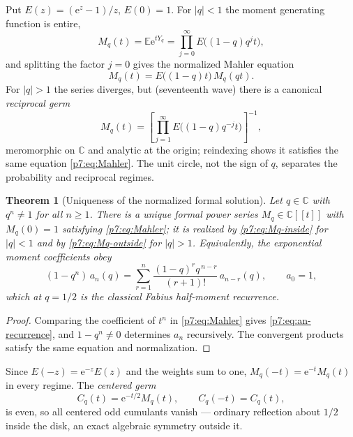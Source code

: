 \documentclass[11pt,oneside]{article}
\numberwithin{equation}{section}
\newtheorem{theorem}{Theorem}[section]
\theoremstyle{definition}
\theoremstyle{remark}
\newcommand{\C}{\mathbb C}
\newcommand{\E}{\mathbb E}
\newcommand{\e}{\mathrm e}
\begin{document}
Put $E(z)=(\e^z-1)/z$, $E(0)=1$.  For $|q|<1$ the moment generating function
is entire,
\begin{equation}\label{p7:eq:Mq-inside}
 M_q(t)=\E\e^{tY_q}
 =\prod_{j=0}^{\infty}E\bigl((1-q)q^jt\bigr),
\end{equation}
and splitting the factor $j=0$ gives the normalized Mahler equation
\begin{equation}\label{p7:eq:Mahler}
 \boxed{\,M_q(t)=E\bigl((1-q)t\bigr)\,M_q(qt).\,}
\end{equation}
For $|q|>1$ the series diverges, but (seventeenth wave) there is a canonical
\emph{reciprocal germ}
\begin{equation}\label{p7:eq:Mq-outside}
 M_q(t)=
 \left[\prod_{j=1}^{\infty}E\bigl((1-q)q^{-j}t\bigr)\right]^{-1},
\end{equation}
meromorphic on $\C$ and analytic at the origin; reindexing shows it satisfies
the same equation \eqref{p7:eq:Mahler}.  The unit circle, not the sign of
$q$, separates the probability and reciprocal regimes.

\begin{theorem}[Uniqueness of the normalized formal solution]
\label{p7:thm:formal-unique}
Let $q\in\C$ with $q^n\ne1$ for all $n\ge1$.  There is a unique formal power
series $M_q\in\C[[t]]$ with $M_q(0)=1$ satisfying \eqref{p7:eq:Mahler}; it is
realized by \eqref{p7:eq:Mq-inside} for $|q|<1$ and by
\eqref{p7:eq:Mq-outside} for $|q|>1$.  Equivalently, the exponential moment
coefficients obey
\begin{equation}\label{p7:eq:an-recurrence}
 (1-q^n)\,a_n(q)=
 \sum_{r=1}^{n}\frac{(1-q)^rq^{\,n-r}}{(r+1)!}\,a_{n-r}(q),
 \qquad a_0=1,
\end{equation}
which at $q=1/2$ is the classical Fabius half-moment recurrence.
\end{theorem}

\begin{proof}
Comparing the coefficient of $t^n$ in \eqref{p7:eq:Mahler} gives
\eqref{p7:eq:an-recurrence}, and $1-q^n\ne0$ determines $a_n$ recursively.
The convergent products satisfy the same equation and normalization.
\end{proof}

Since $E(-z)=\e^{-z}E(z)$ and the weights sum to one,
$M_q(-t)=\e^{-t}M_q(t)$ in every regime.  The \emph{centered germ}
\begin{equation}\label{p7:eq:Cq}
 C_q(t)=\e^{-t/2}M_q(t),
 \qquad C_q(-t)=C_q(t),
\end{equation}
is even, so all centered odd cumulants vanish --- ordinary reflection about
$1/2$ inside the disk, an exact algebraic symmetry outside it.
\end{document}
